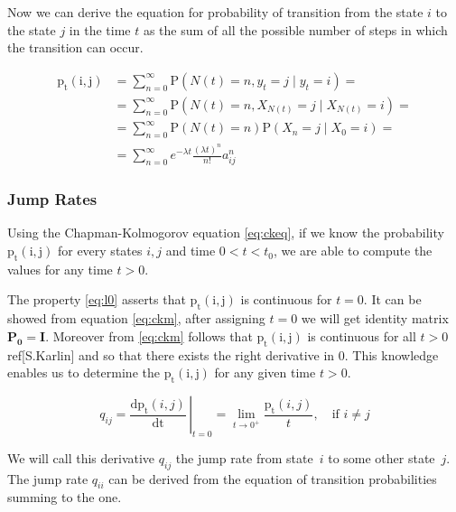 \documentclass[thesis=M,english]{FITthesis}[2012/10/20]
\newcommand{\matr}[1]{\mathbf{#1}}
\begin{document}
Now we can derive the equation for probability of transition from the state $i$ to the state $j$ in the time $t$ as the sum of all the possible number of steps in which the transition can occur. 

\begin{equation}
\begin{aligned}
\mathrm{p_t(i,j)} &= \sum_{n=0}^{\infty} \mathrm{P}( N(t) = n, y_t = j \mid y_t = i )  = \\
                  &= \sum_{n=0}^{\infty} \mathrm{P}( N(t) = n, X_{N(t)} = j \mid X_{N(t)} = i )  = \\
                  &= \sum_{n=0}^{\infty} \mathrm{P}( N(t) = n ) \mathrm{P}( X_n = j \mid X_0 = i )  = \\
				  &= \sum_{n=0}^{\infty} e^{-\lambda t} \frac{ (\lambda t)^n}{n!} a_{ij}^n  
\end{aligned}
\end{equation} 


  




\subsubsection{ Jump Rates }

Using the Chapman-Kolmogorov equation \eqref{eq:ckeq}, if we know the probability $\mathrm{p_t(i,j)}$ for every states $i,j$ and time $0 < t < t_0$, we are able to compute the values for any time $t > 0$. 

The property \eqref{eq:l0}  asserts that $\mathrm{p_t(i,j)}$ is continuous for $t=0$. It can be showed from equation \eqref{eq:ckm}, after assigning $t=0$ we will get identity matrix $\matr{P_0} = \matr{I}$.
Moreover from \eqref{eq:ckm} follows that $\mathrm{p_t(i,j)}$ is continuous for all $t>0$ ref[S.Karlin] and so that there exists the right derivative in 0. This knowledge enables us to determine the $\mathrm{p_t(i,j)}$ for any given time $t>0$.   

\begin{equation}
q_{ij} =  \left.\frac{\mathrm{d}\mathrm{p_t}(i,j)}{\mathrm{dt}} \,\right|_{t=0} = \lim_{t \to 0^+} \frac{\mathrm{p_t}(i,j)}{t}, \quad \text{if } i\neq j     
\end{equation}

We will call this derivative $q_{ij}$ the jump rate from state~$i$ to some other state~$j$. The jump rate $q_{ii}$ can be derived from the equation of transition probabilities summing to the one.
\end{document}
